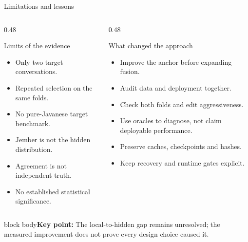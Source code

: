 \documentclass[aspectratio=169,11pt]{beamer}
\newcommand{\takeaway}[1]{\vfill\begin{beamercolorbox}[sep=2mm,wd=\linewidth]{block body}\small\textbf{Key point:} #1\end{beamercolorbox}}
\begin{document}
\begin{frame}{Limitations and lessons}
\begin{columns}[T]
\begin{column}{0.48\textwidth}
\begin{alertblock}{Limits of the evidence}
\begin{itemize}\item Only two target conversations.
\item Repeated selection on the same folds.
\item No pure-Javanese target benchmark.
\item Jember is not the hidden distribution.
\item Agreement is not independent truth.
\item No established statistical significance.
\end{itemize}
\end{alertblock}
\end{column}
\begin{column}{0.48\textwidth}
\begin{block}{What changed the approach}
\begin{itemize}\item Improve the anchor before expanding fusion.
\item Audit data and deployment together.
\item Check both folds and edit aggressiveness.
\item Use oracles to diagnose, not claim deployable performance.
\item Preserve caches, checkpoints and hashes.
\item Keep recovery and runtime gates explicit.
\end{itemize}
\end{block}
\end{column}
\end{columns}
\takeaway{The local-to-hidden gap remains unresolved; the measured improvement does not prove every design choice caused it.}
\end{frame}
\end{document}
